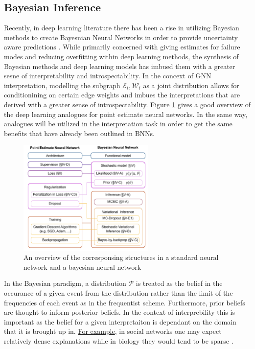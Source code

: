 \subsection{Bayesian Inference}
Recently, in deep learning literature there has been a rise in utilizing Bayesian methods to create Bayesnian Neural Networks in order to provide uncertainty aware predictions \cite{jospin_hands-bayesian_2022}. While primarily concerned with giving estimates for failure modes and reducing overfitting within deep learning methods, the synthesis of Bayesian methods and deep learning models has imbued them with a greater sesne of interpretability and introspectability. In the concext of GNN interpretation, modelling the subgraph $\mathcal{E}_i, \mathcal{W}_i$ as a joint distribution allows for conditionining on certain edge weights and imbues the interpretations that are derived with a greater sense of introspectability. Figure \ref{fig:bnn_overview} gives a good overview of the deep learning analogues for point estimate neural networks. In the same way, analogues will be utilized in the interpretation task in order to get the same benefits that have already been outlined in BNNs.
\begin{figure}[t]
  \centering
  \includegraphics[width=0.6\textwidth]{images/bnn.jpeg}
  \caption{An overview of the corresponsing structures in a standard neural network and a bayesian neural network}
  \label{fig:bnn_overview}
\end{figure}
In the Bayesian paradigm, a distribution $\mathcal{P}$ is treated as the belief in the occurance of a given event from the distribution rather than the limit of the frequencies of each event as in the frequentist scheme. Furthermore, prior beliefs are thought to inform posterior beliefs. In the context of interprebility this is important as the belief for a given interpretaiton is dependant on the domain that it is brought up in. \hyperref[fig:prior]{For example}, in social networks one may expect relatively dense explanations while in biology they would tend to be sparse \cite{cho_friendship_2011} \cite{petralia_new_2016}.

